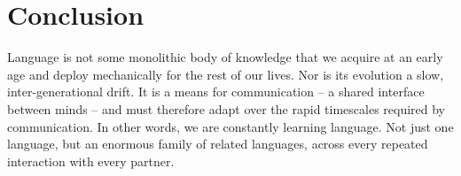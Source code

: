 \documentclass[11pt, floatsintext, jou]{apa6}
\begin{document}

\section{Conclusion}

Language is not some monolithic body of knowledge that we acquire at an early age and deploy mechanically for the rest of our lives. Nor is its evolution a slow, inter-generational drift. It is a means for communication -- a shared interface between minds -- and must therefore adapt over the rapid timescales required by communication. In other words, we are constantly learning language. Not just one language, but an enormous family of related languages, across every repeated interaction with every partner. 


\small
\singlespacing


\end{document}
